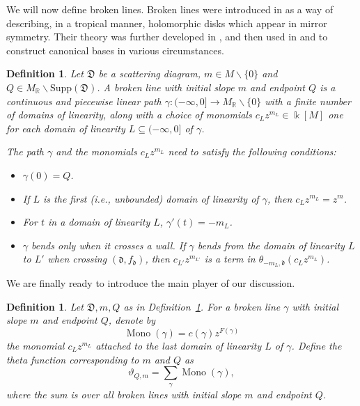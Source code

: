 \documentclass[12pt]{amsart}
\newtheorem{defn}[theorem]{Definition}
\theoremstyle{remark}
\numberwithin{equation}{section}
\newcommand{\RR}{\mathbb{R}}
\newcommand{\dd}{\mathfrak{d}}
\newcommand{\DD}{\mathfrak{D}}
\newcommand{\Mono}{\operatorname{Mono}}
\begin{document}
We will now define broken lines. Broken lines were introduced in \cite{G10} as a
way of describing, in a tropical manner,  holomorphic disks which appear in
mirror symmetry.  Their theory was further developed in \cite{CPS}, and then
used in \cite{GHK11} and \cite{GHKK} to construct canonical bases in various
circumstances.

\begin{defn} 
  \label{brokendef}
  Let $\DD$ be a scattering diagram, $m \in M \backslash \{0\}$ and $Q \in
  M_{\RR} \backslash \text{Supp}(\DD)$.  A \emph{broken line} with initial slope
  $m$ and endpoint $Q$ is a continuous and piecewise linear path $\gamma : ( -
  \infty , 0] \rightarrow M_{\mathbb{R}} \backslash \{ 0\} $ with a finite
  number of domains of linearity, along with a choice of monomials $c_L z^{m_L}
  \in \Bbbk[M]$ one for each domain of linearity $L \subseteq ( - \infty, 0]$ of
  $\gamma$. 
  
  The path $\gamma$ and the monomials $c_L z^{m_L}$ need to satisfy the
  following conditions:
  \begin{itemize}
    \item 
      $\gamma(0) = Q$.
    
    \item 
      If $L$ is the first (i.e., unbounded) domain of linearity of $\gamma$,
      then $c_L z^{m_L} = z^{m}$.

    \item 
      For $t$ in a domain of linearity $L$, $\gamma'(t) = -m_L$.

    \item 
      $\gamma$ bends only when it crosses a wall. If $\gamma$ bends from the
      domain of linearity $L$ to $ L'$ when crossing $(\dd, f_{\dd})$, then
      $c_{L'}z^{m_{L'}}$ is a term in $\theta_{-m_L, \dd} (c_L z^{m_L})$.  
  \end{itemize}
\end{defn}

We are finally ready to introduce the main player of our discussion.
\begin{defn}
  Let $\DD, m, Q$ as in Definition~\ref{brokendef}. For a broken line $\gamma$
  with initial slope $m$ and endpoint $Q$, denote by 
  \[
    \Mono (\gamma) = c(\gamma)z^{F(\gamma)}
  \] 
  the monomial $c_L z^{m_L}$ attached to the last domain of linearity $L$ of
  $\gamma$. Define the \emph{theta function} corresponding to $m$ and $Q$ as
  \[ 
    \vartheta_{Q, m} = \sum_{\gamma} \Mono (\gamma), 
  \] 
  where the sum is over all broken lines with initial slope $m$ and endpoint
  $Q$.
\end{defn}
\end{document}
